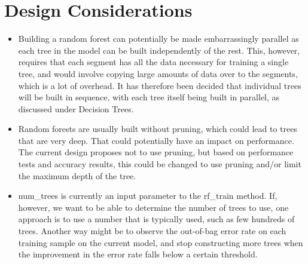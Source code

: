\section{Design Considerations}
\label{sec:designConsiderations}

\begin{itemize}
    \item Building a random forest can potentially be made embarrassingly parallel as each tree
    in the model can be built independently of the rest. This, however, requires that each segment 
    has all the data necessary for training a single tree, and would involve copying large amounts
    of data over to the segments, which is a lot of overhead. It has therefore been decided that
    individual trees will be built in sequence, with each tree itself being built in parallel, as 
    discussed under Decision Trees.
    \item Random forests are usually built without pruning, which could lead to trees that are very 
    deep. That could potentially have an impact on performance. The current design proposes 
    not to use pruning, but based on performance tests and accuracy results, this could be changed 
    to use pruning and/or limit the maximum depth of the tree.
    \item num\_trees is currently an input parameter to the rf\_train method. If, however, we want
    to be able to determine the number of trees to use, one approach is to use a number that is
    typically used, such as few hundreds of trees. Another way might be to observe the out-of-bag 
    error rate on each training sample on the current model, and stop constructing more trees when 
    the improvement in the error rate falls below a certain threshold.
\end{itemize}


